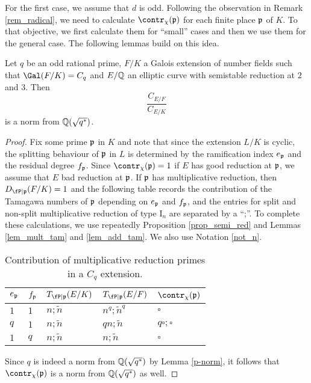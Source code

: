 For the first case, we assume that $d$ is odd. Following the observation in Remark \ref{rem_radical}, we need to calculate $\contr_\chi(\pp)$ for each finite place $\mathfrak{p}$ of $K$. To that objective, we first calculate them for ``small'' cases and then we use them for the general case. The following lemmas build on this idea.

\begin{lemma}\label{lem_Cp}
    Let $q$ be an odd rational prime, $F/K$ a Galois extension of number fields such that $\Gal(F/K)=C_q$ and $E/\mathbb{Q}$ an elliptic curve with semistable reduction at $2$ and $3$. Then 
    $$\frac{C_{E/F}}{C_{E/K}}$$
    is a norm from $\mathbb{Q}(\sqrt{q^*})$.
\end{lemma}

\begin{proof}
    Fix some prime $\mathfrak{p}$ in $K$ and note that since the extension $L/K$ is cyclic, the splitting behaviour of $\mathfrak{p}$ in $L$ is determined by the ramification index $e_{\mathfrak{p}}$ and the residual degree $f_{\mathfrak{p}}$. Since $\contr_\chi(\pp)=1$ if $E$ has good reduction at $\mathfrak{p}$, we assume that $E$ bad reduction at $\mathfrak{p}$. If $\mathfrak{p}$ has multiplicative reduction, then $D_{\fP\mid\pp}(F/K)=1$ and the following table records the contribution of the Tamagawa numbers of $\mathfrak{p}$ depending on $e_{\mathfrak{p}}$ and $f_{\mathfrak{p}}$, and the entries for split and non-split multiplicative reduction of type $\mathrm{I}_n$ are separated by a ``;''. To complete these calculations, we use repeatedly Proposition \ref{prop_semi_red} and Lemmas \ref{lem_mult_tam} and \ref{lem_add_tam}. We also use Notation \ref{not_n}.

    \begin{table}[!ht]\label{table_Cp}
        \centering
        \begin{tabular}{|l|l|l|l|l|}
        \hline
        $e_{\mathfrak{p}}$ & $f_{\mathfrak{p}}$  & $T_{\fP\mid \pp}(E/K)$ & $T_{\fP\mid \pp}(E/F)$  & $\contr_\chi(\pp)$ \\ \hline
        $1$ & $1$ & $n;\tilde{n}$ & $n^q;\tilde{n}^q$ & $\square$ \\ \hline
        $q$ & $1$ & $n;\tilde{n}$ & $qn;\tilde{n}$ & $q\square;\square$ \\ \hline
        $1$ & $q$ & $n;\tilde{n}$ & $n;\tilde{n}$ & $\square$ \\ \hline
        \end{tabular}
        \caption{Contribution of multiplicative reduction primes in a $C_q$ extension.}
    \end{table}

    Since $q$ is indeed a norm from $\mathbb{Q}(\sqrt{q^*})$ by Lemma \ref{p-norm}, it follows that $\contr_\chi(\pp)$ is a norm from $\mathbb{Q}(\sqrt{q^*})$ as well.


\end{proof}
